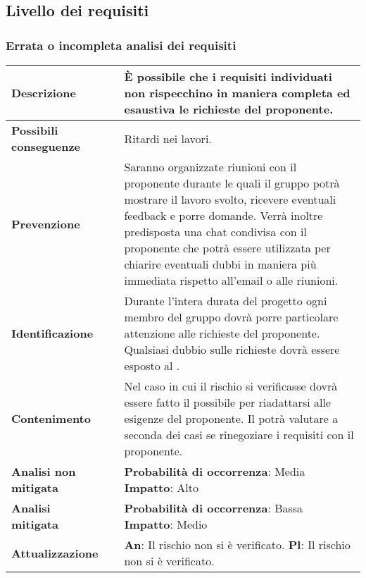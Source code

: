 	\newpage
	\subsection {Livello dei requisiti}
		\subsubsection {Errata o incompleta analisi dei requisiti}
			\label{subsec:erratiRequisiti}
			
						\small
						\begin{table}[H]
						\begin{center}			
						\begin{tabular}{p{2.5cm}p{0.5cm}p{11cm}}
						\arrayrulecolor{lightgray}
						
						\toprule				
							\textbf{Descrizione}
							& &
							È possibile che i requisiti individuati non rispecchino in maniera completa ed esaustiva le richieste del proponente.
						\\
						\midrule
							\textbf{Possibili \newline conseguenze}
							& &
							Ritardi nei lavori.
						\\
						\midrule
							\textbf{Prevenzione}
							& &
							Saranno organizzate riunioni con il proponente durante le quali il gruppo potrà mostrare il lavoro svolto, ricevere eventuali feedback e porre domande. Verrà inoltre predisposta una chat condivisa con il proponente che potrà essere utilizzata per chiarire eventuali dubbi in maniera più immediata rispetto all'email o alle riunioni.
						\\
						\midrule
							\textbf{Identificazione}
							& &
							Durante l'intera durata del progetto ogni membro del gruppo dovrà porre particolare attenzione alle richieste del proponente. Qualsiasi dubbio sulle richieste dovrà essere esposto al \responsabilediprogetto.
						\\
						\midrule
							\textbf{Contenimento}
							& &
							Nel caso in cui il rischio si verificasse dovrà essere fatto il possibile per riadattarsi alle esigenze del proponente. Il \responsabilediprogetto{} potrà valutare a seconda dei casi se rinegoziare i requisiti con il proponente.
						\\
						\midrule
							\textbf{Analisi \newline non mitigata}
							& &
							\textbf{Probabilità di occorrenza}: Media
							\newline
							\textbf{Impatto}: Alto
						\\
						\midrule
							\textbf{Analisi \newline mitigata}
							& &
							\textbf{Probabilità di occorrenza}: Bassa
							\newline
							\textbf{Impatto}: Medio
						\\
						\midrule
							\textbf{Attualizzazione}
							& &
							\textbf{An}: Il rischio non si è verificato.
							\newline
							\textbf{Pl}: Il rischio non si è verificato.
						\\
						

\end{tabular}
\end{center}
\end{table}
